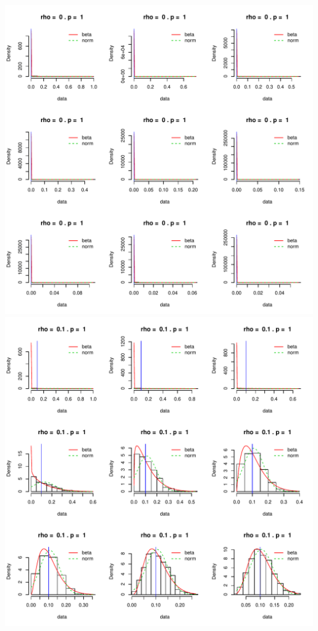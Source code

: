 \documentclass[]{article}
\begin{document}
\includegraphics{2016_w09_files/figure-latex/unnamed-chunk-13-1.pdf}
\includegraphics{2016_w09_files/figure-latex/unnamed-chunk-13-2.pdf}
\end{document}
